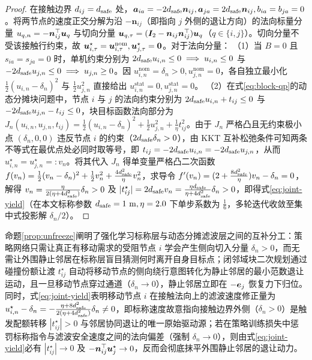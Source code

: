 \begin{proof}
在接触边界 $d_{ij}=d_{\mathrm{safe}}$ 处，$\boldsymbol a_{ia}=-2d_{\mathrm{safe}}\boldsymbol n_{ij},\boldsymbol a_{ja}=2d_{\mathrm{safe}}\boldsymbol n_{ij},b_{ia}=b_{ja}=0$。将两节点的速度正交分解为沿 $-\boldsymbol n_{ij}$（即指向 $j$ 外侧的退让方向）的法向标量分量 $u_{q,n}=-\boldsymbol n_{ij}^{\top}\boldsymbol{u}_q$ 与切向分量 $\boldsymbol{u}_{q,\tau}=(\boldsymbol{I}_2-\boldsymbol n_{ij}\boldsymbol n_{ij}^{\top})\boldsymbol{u}_q$（$q\in\{i,j\}$）。切向分量不受该接触行约束，故 $\boldsymbol{u}_{i,\tau}^\star=\boldsymbol{u}_{i,\tau}^{\mathrm{nom}},\boldsymbol{u}_{j,\tau}^\star=\boldsymbol 0$。对于法向分量：
（1）当 $B=0$ 且 $s_{ia}=s_{ja}=0$ 时，单机约束分别为 $2d_{\mathrm{safe}} u_{i,n}\le 0\implies u_{i,n}\le 0$ 与 $-2d_{\mathrm{safe}} u_{j,n}\le 0\implies u_{j,n}\ge 0$。因 $u_{i,n}^{\mathrm{nom}}=\delta_n>0,u_{j,n}^{\mathrm{nom}}=0$，各自独立最小化 $\frac12(u_{i,n}-\delta_n)^2$ 与 $\frac12 u_{j,n}^2$ 直接给出 $u_{i,n}^{\mathrm{stat}}=0,u_{j,n}^{\mathrm{stat}}=0$。
（2）在式\eqref{eq:block-qp}的动态分摊块问题中，节点 $i$ 与 $j$ 的法向约束分别为 $2d_{\mathrm{safe}} u_{i,n}+t_{ij}\le 0$ 与 $-2d_{\mathrm{safe}} u_{j,n}-t_{ij}\le 0$，块目标函数法向部分为 $J_n(u_{i,n},u_{j,n},t_{ij})=\frac12(u_{i,n}-\delta_n)^2+\frac12 u_{j,n}^2+\frac{1}{\eta}t_{ij}^2$。由于 $J_n$ 严格凸且无约束极小点 $(\delta_n,0,0)$ 违反节点 $i$ 的约束（$2d_{\mathrm{safe}}\delta_n>0$），由 KKT 互补松弛条件可知两条不等式在最优点处必同时取等号，即 $t_{ij}=-2d_{\mathrm{safe}} u_{i,n}=-2d_{\mathrm{safe}} u_{j,n}$，从而 $u_{i,n}^\star=u_{j,n}^\star=:v_n$。将其代入 $J_n$ 得单变量严格凸二次函数 $f(v_n)=\frac12(v_n-\delta_n)^2+\frac12 v_n^2+\frac{4d_{\mathrm{safe}}^2}{\eta}v_n^2$，求导令 $f'(v_n)=(2+\frac{8d_{\mathrm{safe}}^2}{\eta})v_n-\delta_n=0$，解得 $v_n=\frac{\eta}{2(\eta+4d_{\mathrm{safe}}^2)}\delta_n>0$ 及 $|t_{ij}^\star|=2d_{\mathrm{safe}} v_n=\frac{\eta d_{\mathrm{safe}}}{\eta+4d_{\mathrm{safe}}^2}\delta_n>0$，即得式\eqref{eq:joint-yield}（在本文标称参数 $d_{\mathrm{safe}}=1\ \mathrm m,\eta=2.0$ 下单步系数为 $\frac16$，多轮迭代收敛至集中式投影解 $\delta_n/2$）。
\end{proof}

命题\ref{prop:unfreeze}阐明了强化学习标称层与动态分摊滤波层之间的互补分工：策略网络只需让真正有移动需求的受阻节点 $i$ 学会产生侧向切入分量 $\delta_n>0$，而无需让外围静止邻居在标称层盲目猜测何时离开自身目标点；闭邻域块二次规划通过碰撞份额让渡 $t_{ij}^\star$ 自动将移动节点的侧向绕行意图转化为静止邻居的最小范数退让运动，且一旦移动节点穿过通道（$\delta_n\to 0$），静止邻居立即在 $-\boldsymbol{e}_j$ 恢复力下归位。同时，式\eqref{eq:joint-yield}表明移动节点 $i$ 在接触法向上的滤波速度修正量为 $u_{i,n}^\star-\delta_n=-\frac{\eta+8d_{\mathrm{safe}}^2}{2(\eta+4d_{\mathrm{safe}}^2)}\delta_n\ne 0$，即标称速度故意指向接触边界外侧（$\delta_n>0$）是触发配额转移 $|t_{ij}^\star|>0$ 与邻居协同退让的唯一原始驱动源；若在策略训练损失中惩罚标称指令与滤波安全速度之间的法向偏差（强制 $\delta_n\to 0$），则由式\eqref{eq:joint-yield}必有 $|t_{ij}^\star|\to 0$ 及 $-\boldsymbol n_{ij}^{\top}\boldsymbol{u}_j^\star\to 0$，反而会彻底抹平外围静止邻居的退让动力。

